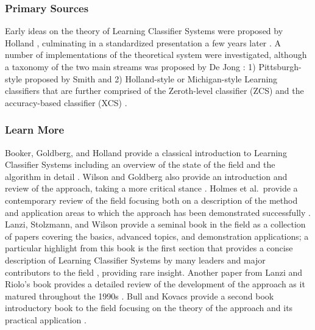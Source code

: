 % 
% 
\subsubsection{Primary Sources}
Early ideas on the theory of Learning Classifier Systems were proposed by Holland \cite{Holland1976, Holland1977}, culminating in a standardized presentation a few years later \cite{Holland1980}.
A number of implementations of the theoretical system were investigated, although a taxonomy of the two main streams was proposed by De Jong \cite{Jong1988}: 1) Pittsburgh-style proposed by Smith \cite{Smith1980, Smith1983} and 2) Holland-style or Michigan-style Learning classifiers that are further comprised of the Zeroth-level classifier (ZCS) \cite{Wilson1994} and the accuracy-based classifier (XCS) \cite{Wilson1995}.

% 
% 
\subsubsection{Learn More}
Booker, Goldberg, and Holland provide a classical introduction to Learning Classifier Systems including an overview of the state of the field and the algorithm in detail \cite{Booker1989}. Wilson and Goldberg also provide an introduction and review of the approach, taking a more critical stance \cite{Wilson1989}.
Holmes et al.\ provide a contemporary review of the field focusing both on a description of the method and application areas to which the approach has been demonstrated successfully \cite{Holmes2002}.
Lanzi, Stolzmann, and Wilson provide a seminal book in the field as a collection of papers covering the basics, advanced topics, and demonstration applications; a particular highlight from this book is the first section that provides a concise description of Learning Classifier Systems by many leaders and major contributors to the field \cite{Holland2000}, providing rare insight. 
Another paper from Lanzi and Riolo's book provides a detailed review of the development of the approach as it matured throughout the 1990s \cite{Lanzi2000a}.
Bull and Kovacs provide a second book introductory book to the field focusing on the theory of the approach and its practical application \cite{Bull2005}.


